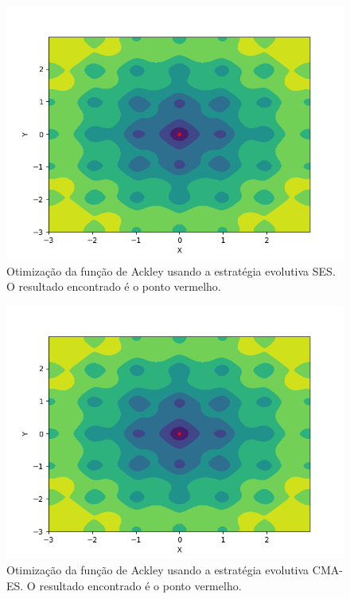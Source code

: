 \documentclass[conference]{IEEEtran}
\begin{document}
\begin{figure}[htbp]
\centering
\centerline{\includegraphics[scale=0.5]{imagens/ackley/ses.png}}
\caption{Otimização da função de Ackley usando a estratégia evolutiva SES. O resultado encontrado é o ponto vermelho.}
\label{ackley/ses}
\end{figure} 

\begin{figure}[htbp]
\centering
\centerline{\includegraphics[scale=0.5]{imagens/ackley/cmaes.png}}
\caption{Otimização da função de Ackley usando a estratégia evolutiva CMA-ES. O resultado encontrado é o ponto vermelho.}
\label{ackley/cmaes}
\end{figure}
\end{document}
